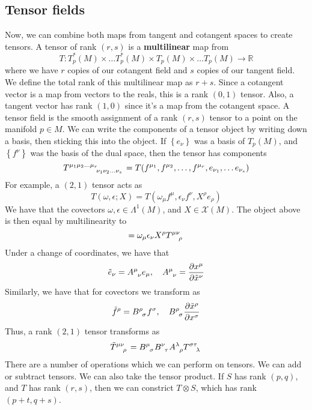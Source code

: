 \subsection{Tensor fields} 
Now, we can combine both maps from tangent and cotangent spaces to create tensors. 
A tensor of rank $( r, s) $ is a \textbf{multilinear} map from 
\[
T: T_p^* ( M ) \times \dots T_p^*( M )  \times T_p(M) \times \dots T_p( M) \to  \mathbb{ R}  
\] where we have $r  $ copies of our cotangent field and $ s$ copies of our tangent field. 
We define the total rank of this multilinear map as $ r + s$. 
Since a cotangent vector is a map from vectors to the reals, 
this is a rank  $ ( 0, 1 ) $ tensor. 
Also, a tangent vector has rank $ ( 1, 0 ) $ since it's a map from the
cotangent space. 
A tensor field is the smooth assignment of a rank $ ( r, s) $ tensor to a point
on the manifold $ p \in M $. 
We can write the components of a tensor object 
by writing down a basis, then sticking this into the object. 
If $ \left\{  e_\nu \right\} $ was a basis of $ T_{p }( M ) $, and 
$ \left\{  f^\nu \right\} $ was the basis of the dual space, then 
the tensor has components 
\[
T \indices{^{\mu_1 } ^{\mu_2} ^{\dots } ^{\mu_r}_{\nu_1 }_{\nu_2 } _{\dots }_{\nu_s}} = T(f^{\mu_1 }, f^{\mu_2}, \dots, f^{\mu_r}, e_{\nu_1 }, \dots e_{\nu_s} )  
\]
For example, a $ ( 2 , 1) $ tensor acts as 
\[
T ( \omega , \epsilon; X) = T ( \omega_{\mu } f^\mu, \epsilon_{ \nu }f^\nu, X^\rho e_{ \rho }) 
\] We have that the covectors $ \omega  , \epsilon \in \Lambda^ 1 ( M ) $, and $  X\in \mathcal{ X }( M ) $. 
The object above is then equal by multilinearity to 
\[
= \omega _{ \mu } \epsilon_{\nu } X^\rho T \indices{ ^\mu ^ \nu _\rho }  
\] Under a change of coordinates, we have that 
\[
\tilde{ e}_{ \nu } = A \indices{^\mu _ \nu } e_{ \mu }, \quad A \indices{ ^ \mu _ \nu } = \frac{\partial  x^\mu }{\partial \tilde{ x}^\nu}   
\] 
Similarly, we have that for covectors we transform as 
\[
\tilde{ f} ^\rho = B \indices{ ^\rho _\sigma } f^\sigma, \quad B \indices{ ^\rho _\sigma } \frac{\partial  \tilde{ x}^\rho}{\partial x^\sigma}    
\] Thus, a rank $ ( 2, 1 ) $ tensor transforms as 
\[
\tilde{ T } \indices{^\mu^\nu_\rho}  = B \indices{^\mu_\sigma } B \indices{^\nu _\tau} A \indices{^\lambda _\rho} T \indices{^\sigma ^\tau _ \lambda}     
\] There are a number of operations which we can perform on tensors. 
We can add or subtract tensors. We can also take the tensor product. 
If $ S $ has rank $ ( p , q) $, and $  T $ has rank $ ( r, s ) $, then 
we can constrict $ T \otimes S $, which has rank $ ( p + t , q + s ) $. 
